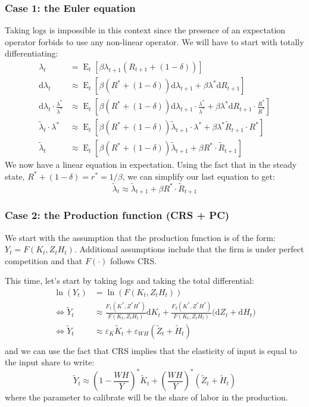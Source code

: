 \documentclass[12pt]{report}
\def\D{\mathrm{d}}
\newcommand{\Et}[1]{\operatorname{E}_t\left[#1\right]}
\def\D{\mathrm{d}}
\begin{document}
\subsubsection{Case 1: the Euler equation}

Taking logs is impossible in this context since the presence of an expectation operator forbids to use any non-linear operator. We will have to start with totally differentiating:\begin{align*}
\lambda_t & = \Et{\beta\lambda_{t+1}( R_{t+1} + (1-\delta))} \\ 
\D\lambda_t & \approx \Et{ \beta(R^* + (1-\delta))\D\lambda_{t+1} + \beta\lambda^*\D R_{t+1}} \\
\D\lambda_t\cdot\frac{\lambda^*}{\lambda^*} & \approx \Et{ \beta(R^* + (1-\delta))\D\lambda_{t+1}\cdot\frac{\lambda^*}{\lambda^*} + \beta\lambda^*\D R_{t+1}\cdot\frac{R^*}{R^*}} \\
\tilde \lambda_t\cdot \lambda^* & \approx \Et{ \beta(R^* + (1-\delta))\tilde \lambda_{t+1}\cdot\lambda^* + \beta\lambda^*\tilde R_{t+1}\cdot R^*} \\
\tilde \lambda_t & \approx \Et{ \beta(R^* + (1-\delta))\tilde \lambda_{t+1} + \beta R^*\cdot\tilde R_{t+1} }
\end{align*} We now have a linear equation in expectation. Using the fact that in the steady state, $R^* + (1-\delta) = r^* = 1/\beta$, we can simplify our last equation to get: $$\tilde\lambda_t  \approx \tilde\lambda_{t+1} + \beta R^*\cdot\tilde R_{t+1}$$

\subsubsection{Case 2: the Production function (CRS + PC)}

We start with the assumption that the production function is of the form: $Y_t = F(K_t, Z_tH_t)$. Additional assumptions include that the firm is under perfect competition and that $F(\cdot)$ follows CRS.

This time, let's start by taking logs and taking the total differential:\begin{align*}
\ln(Y_t)&= \ln(F(K_t, Z_tH_t)) \\ \Leftrightarrow \tilde{Y}_t &\approx \frac{F_1(K^*, Z^*H^*)}{F(K_t, Z_tH_t)}\D K_t + \frac{F_2(K^*, Z^*H^*)}{F(K_t, Z_tH_t)}\big(\D Z_t + \D H_t\big) \\ \Leftrightarrow \tilde{Y}_t &\approx \varepsilon_{K} \tilde K_t + \varepsilon_{WH}(\tilde Z_t + \tilde H_t) \\
\end{align*}and we can use the fact that CRS implies that the elasticity of input is equal to the input share to write: $$\tilde{Y}_t \approx \left(1 - \frac{WH}{Y}\right)^* \tilde K_t + \left(\frac{WH}{Y}\right)^*(\tilde Z_t + \tilde H_t)$$ where the parameter to calibrate will be the share of labor in the production.
\end{document}
